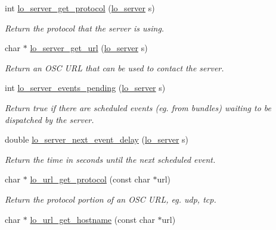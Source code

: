 \begin{CompactItemize}
int \hyperlink{group__liblolowlevel_gb40a599fe8440512b18479dac333e89f}{lo\_\-server\_\-get\_\-protocol} (\hyperlink{lo__types_8h_59067bf50cf8abb4371da6f03c9036c9}{lo\_\-server} s)
\begin{CompactList}\small\item\em Return the protocol that the server is using. \item\end{CompactList}\item 
char $\ast$ \hyperlink{group__liblolowlevel_g33df48c641833d330a8ba6704caf4977}{lo\_\-server\_\-get\_\-url} (\hyperlink{lo__types_8h_59067bf50cf8abb4371da6f03c9036c9}{lo\_\-server} s)
\begin{CompactList}\small\item\em Return an OSC URL that can be used to contact the server. \item\end{CompactList}\item 
int \hyperlink{group__liblolowlevel_g04feb1063c3f4df6fec41405b28dd99a}{lo\_\-server\_\-events\_\-pending} (\hyperlink{lo__types_8h_59067bf50cf8abb4371da6f03c9036c9}{lo\_\-server} s)
\begin{CompactList}\small\item\em Return true if there are scheduled events (eg. from bundles) waiting to be dispatched by the server. \item\end{CompactList}\item 
double \hyperlink{group__liblolowlevel_g750076fdd75e2a7d3e442f6bd5968fb9}{lo\_\-server\_\-next\_\-event\_\-delay} (\hyperlink{lo__types_8h_59067bf50cf8abb4371da6f03c9036c9}{lo\_\-server} s)
\begin{CompactList}\small\item\em Return the time in seconds until the next scheduled event. \item\end{CompactList}\item 
char $\ast$ \hyperlink{group__liblolowlevel_g58266d3085b73fc4dc5e1913de810b22}{lo\_\-url\_\-get\_\-protocol} (const char $\ast$url)
\begin{CompactList}\small\item\em Return the protocol portion of an OSC URL, eg. udp, tcp. \item\end{CompactList}\item 
char $\ast$ \hyperlink{group__liblolowlevel_gb1b7df7061a0b2cd0db31d3fca1b399b}{lo\_\-url\_\-get\_\-hostname} (const char $\ast$url)

\end{CompactItemize}
